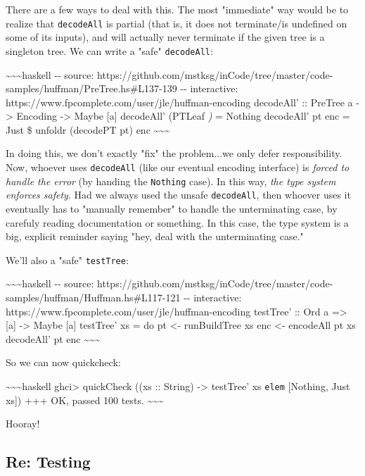 \documentclass[]{article}
\begin{document}
There are a few ways to deal with this. The most "immediate" way would be to
realize that \texttt{decodeAll} is partial (that is, it does not terminate/is
undefined on some of its inputs), and will actually never terminate if the given
tree is a singleton tree. We can write a "safe" \texttt{decodeAll}:

\textasciitilde{}\textasciitilde{}\textasciitilde{}haskell -\/- source:
https://github.com/mstksg/inCode/tree/master/code-samples/huffman/PreTree.hs\#L137-139
-\/- interactive: https://www.fpcomplete.com/user/jle/huffman-encoding
decodeAll' :: PreTree a -\textgreater{} Encoding -\textgreater{} Maybe {[}a{]}
decodeAll' (PTLeaf \emph{) } = Nothing decodeAll' pt enc = Just \$ unfoldr
(decodePT pt) enc \textasciitilde{}\textasciitilde{}\textasciitilde{}

In doing this, we don't exactly "fix" the problem...we only defer
responsibility. Now, whoever uses \texttt{decodeAll\textquotesingle{}} (like our
eventual encoding interface) is \emph{forced to handle the error} (by handing
the \texttt{Nothing} case). In this way, \emph{the type system enforces safety}.
Had we always used the unsafe \texttt{decodeAll}, then whoever uses it
eventually has to "manually remember" to handle the unterminating case, by
carefuly reading documentation or something. In this case, the type system is a
big, explicit reminder saying "hey, deal with the unterminating case."

We'll also a "safe" \texttt{testTree}:

\textasciitilde{}\textasciitilde{}\textasciitilde{}haskell -\/- source:
https://github.com/mstksg/inCode/tree/master/code-samples/huffman/Huffman.hs\#L117-121
-\/- interactive: https://www.fpcomplete.com/user/jle/huffman-encoding testTree'
:: Ord a =\textgreater{} {[}a{]} -\textgreater{} Maybe {[}a{]} testTree' xs = do
pt \textless{}- runBuildTree xs enc \textless{}- encodeAll pt xs decodeAll' pt
enc \textasciitilde{}\textasciitilde{}\textasciitilde{}

So we can now quickcheck:

\textasciitilde{}\textasciitilde{}\textasciitilde{}haskell ghci\textgreater{}
quickCheck ((xs :: String) -\textgreater{} testTree' xs \texttt{elem}
{[}Nothing, Just xs{]}) +++ OK, passed 100 tests.
\textasciitilde{}\textasciitilde{}\textasciitilde{}

Hooray!

\subsection{Re: Testing}
\end{document}
